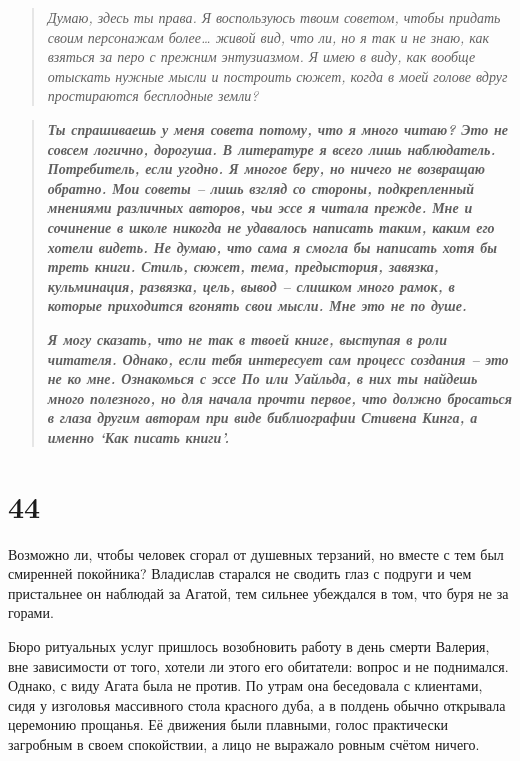 \documentclass[
  a5paperpaper,
  DIV=11,
  numbers=noendperiod]{scrreprt}
\begin{document}
\begin{quote}
\emph{Думаю, здесь ты права. Я воспользуюсь твоим советом, чтобы придать
своим персонажам более\ldots{} живой вид, что ли, но я так и не знаю,
как взяться за перо с прежним энтузиазмом. Я имею в виду, как вообще
отыскать нужные мысли и построить сюжет, когда в моей голове вдруг
простираются бесплодные земли?}
\end{quote}

\begin{quote}
\textbf{\emph{Ты спрашиваешь у меня совета потому, что я много читаю?
Это не совсем логично, дорогуша. В литературе я всего лишь наблюдатель.
Потребитель, если угодно. Я многое беру, но ничего не возвращаю обратно.
Мои советы -- лишь взгляд со стороны, подкрепленный мнениями различных
авторов, чьи эссе я читала прежде. Мне и сочинение в школе никогда не
удавалось написать таким, каким его хотели видеть. Не думаю, что сама я
смогла бы написать хотя бы треть книги. Стиль, сюжет, тема, предыстория,
завязка, кульминация, развязка, цель, вывод -- слишком много рамок, в
которые приходится вгонять свои мысли. Мне это не по душе.}}

\textbf{\emph{Я могу сказать, что не так в твоей книге, выступая в роли
читателя. Однако, если тебя интересует сам процесс создания -- это не ко
мне. Ознакомься с эссе По или Уайльда, в них ты найдешь много полезного,
но для начала прочти первое, что должно бросаться в глаза другим авторам
при виде библиографии Стивена Кинга, а именно `Как писать книги'.}}
\end{quote}

\section*{44}\label{44}


Возможно ли, чтобы человек сгорал от душевных терзаний, но вместе с тем
был смиренней покойника? Владислав старался не сводить глаз с подруги и
чем пристальнее он наблюдай за Агатой, тем сильнее убеждался в том, что
буря не за горами.

Бюро ритуальных услуг пришлось возобновить работу в день смерти Валерия,
вне зависимости от того, хотели ли этого его обитатели: вопрос и не
поднимался. Однако, с виду Агата была не против. По утрам она беседовала
с клиентами, сидя у изголовья массивного стола красного дуба, а в
полдень обычно открывала церемонию прощанья. Её движения были плавными,
голос практически загробным в своем спокойствии, а лицо не выражало
ровным счётом ничего.
\end{document}
